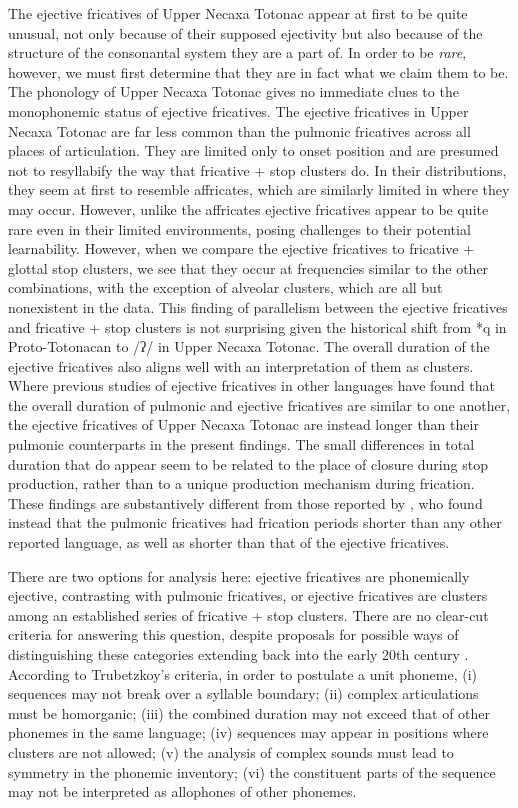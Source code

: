 \documentclass[output=paper,colorlinks,citecolor=brown]{langscibook}
\begin{document}
The ejective fricatives of Upper Necaxa Totonac appear at first to be quite unusual, not only because of their supposed ejectivity but also because of the structure of the consonantal system they are a part of. In order to be \textit{rare}, however, we must first determine that they are in fact what we claim them to be. The phonology of Upper Necaxa Totonac gives no immediate clues to the monophonemic status of ejective fricatives. The ejective fricatives in Upper Necaxa Totonac are far less common than the pulmonic fricatives across all places of articulation. They are limited only to onset position and are presumed not to resyllabify the way that fricative + stop clusters do. In their distributions, they seem at first to resemble affricates, which are similarly limited in where they may occur. However, unlike the affricates ejective fricatives appear to be quite rare even in their limited environments, posing challenges to their potential learnability. However, when we compare the ejective fricatives to fricative + glottal stop clusters, we see that they occur at frequencies similar to the other combinations, with the exception of alveolar clusters, which are all but nonexistent in the data. This finding of parallelism between the ejective fricatives and fricative + stop clusters is not surprising given the historical shift from *q in Proto-Totonacan to /ʔ/ in Upper Necaxa Totonac. The overall duration of the ejective fricatives also aligns well with an interpretation of them as clusters. Where previous studies of ejective fricatives in other languages have found that the overall duration of pulmonic and ejective fricatives are similar to one another, the ejective fricatives of Upper Necaxa Totonac are instead longer than their pulmonic counterparts in the present findings. The small differences in total duration that do appear seem to be related to the place of closure during stop production, rather than to a unique production mechanism during frication. These findings are substantively different from those reported by \citet{Beck2006}, who found instead that the pulmonic fricatives had frication periods shorter than any other reported language, as well as shorter than that of the ejective fricatives.

There are two options for analysis here: ejective fricatives are phonemically ejective, contrasting with pulmonic fricatives, or ejective fricatives are clusters among an established series of fricative + stop clusters. There are no clear-cut criteria for answering this question, despite proposals for possible ways of distinguishing these categories extending back into the early 20th century \citep{Trubetzkoy1939,Pike1947,Stark1947,Uchihara2021}. According to Trubetzkoy's criteria, in order to postulate a unit phoneme, (i) sequences may not break over a syllable boundary; (ii) complex articulations must be homorganic; (iii) the combined duration may not exceed that of other phonemes in the same language; (iv) sequences may appear in positions where clusters are not allowed; (v) the analysis of complex sounds must lead to symmetry in the phonemic inventory; (vi) the constituent parts of the sequence may not be interpreted as allophones of other phonemes. 
\end{document}
